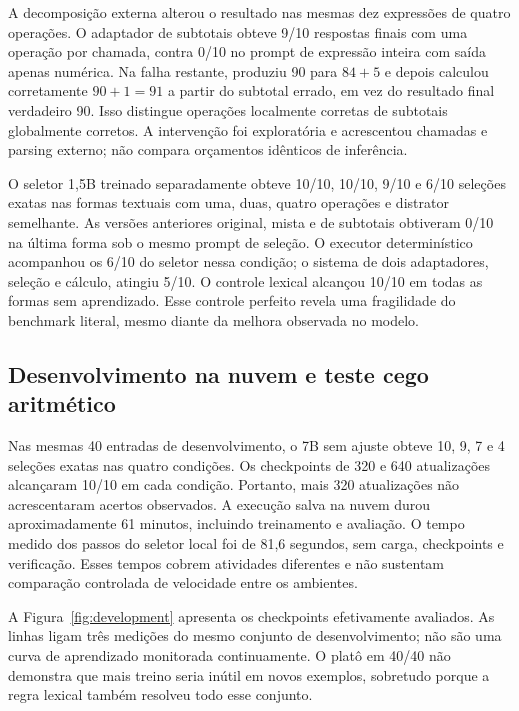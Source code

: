 \documentclass[12pt,a4paper]{article}
\begin{document}
A decomposição externa alterou o resultado nas mesmas dez expressões de quatro operações. O adaptador de subtotais obteve 9/10 respostas finais com uma operação por chamada, contra 0/10 no prompt de expressão inteira com saída apenas numérica. Na falha restante, produziu 90 para $84+5$ e depois calculou corretamente $90+1=91$ a partir do subtotal errado, em vez do resultado final verdadeiro 90. Isso distingue operações localmente corretas de subtotais globalmente corretos. A intervenção foi exploratória e acrescentou chamadas e parsing externo; não compara orçamentos idênticos de inferência.

O seletor 1,5B treinado separadamente obteve 10/10, 10/10, 9/10 e 6/10 seleções exatas nas formas textuais com uma, duas, quatro operações e distrator semelhante. As versões anteriores original, mista e de subtotais obtiveram 0/10 na última forma sob o mesmo prompt de seleção. O executor determinístico acompanhou os 6/10 do seletor nessa condição; o sistema de dois adaptadores, seleção e cálculo, atingiu 5/10. O controle lexical alcançou 10/10 em todas as formas sem aprendizado. Esse controle perfeito revela uma fragilidade do benchmark literal, mesmo diante da melhora observada no modelo.

\subsection{Desenvolvimento na nuvem e teste cego aritmético}
Nas mesmas 40 entradas de desenvolvimento, o 7B sem ajuste obteve 10, 9, 7 e 4 seleções exatas nas quatro condições. Os checkpoints de 320 e 640 atualizações alcançaram 10/10 em cada condição. Portanto, mais 320 atualizações não acrescentaram acertos observados. A execução salva na nuvem durou aproximadamente 61 minutos, incluindo treinamento e avaliação. O tempo medido dos passos do seletor local foi de 81,6 segundos, sem carga, checkpoints e verificação. Esses tempos cobrem atividades diferentes e não sustentam comparação controlada de velocidade entre os ambientes.

A Figura~\ref{fig:development} apresenta os checkpoints efetivamente avaliados. As linhas ligam três medições do mesmo conjunto de desenvolvimento; não são uma curva de aprendizado monitorada continuamente. O platô em 40/40 não demonstra que mais treino seria inútil em novos exemplos, sobretudo porque a regra lexical também resolveu todo esse conjunto.
\end{document}
